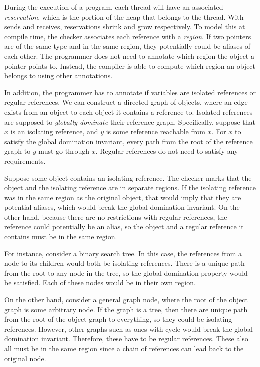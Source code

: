 \documentclass{article}
\begin{document}
  During the execution of a program,
    each thread will have an associated \textit{reservation},
    which is the portion of the heap that belongs to the thread.
  With sends and receives,
    reservations shrink and grow respectively.
  To model this at compile time,
    the checker associates each reference with a \textit{region}.
  If two pointers are of the same type and in the same region,
    they potentially could be aliases of each other.
  The programmer does not need to annotate which region the object a pointer points to.
  Instead,
    the compiler is able to compute which region an object belongs to
    using other annotations.

  In addition,
    the programmer has to annotate if variables are isolated references
    or regular references.
  We can construct a directed graph of objects,
    where an edge exists from an object to each object it contains a reference to.
  Isolated references are supposed to \textit{globally dominate} their reference graph.
  Specifically,
    suppose that $x$ is an isolating reference,
    and $y$ is some reference reachable from $x$.
  For $x$ to satisfy the global domination invariant,
    every path from the root of the reference graph to $y$
    must go through $x$.
  Regular references do not need to satisfy any requirements.

  Suppose some object contains an isolating reference.
  The checker marks that the object and the isolating reference are in separate regions.
  If the isolating reference was in the same region as the original object,
    that would imply that they are potential aliases,
    which would break the global domination invariant.
  On the other hand,
    because there are no restrictions with regular references,
    the reference could potentially be an alias,
    so the object and a regular reference it contains must be in the same region.

  For instance,
    consider a binary search tree.
  In this case,
    the references from a node to its children would both be isolating references.
  There is a unique path from the root to any node in the tree,
    so the global domination property would be satisfied.
  Each of these nodes would be in their own region.

  On the other hand,
    consider a general graph node,
    where the root of the object graph is some arbitrary node.
  If the graph is a tree,
    then there are unique path from the root of the object graph to everything,
    so they could be isolating references.
  However,
    other graphs such as ones with cycle would break the global domination invariant.
  Therefore,
    these have to be regular references.
  These also all must be in the same region
    since a chain of references can lead back to the original node.
\end{document}
